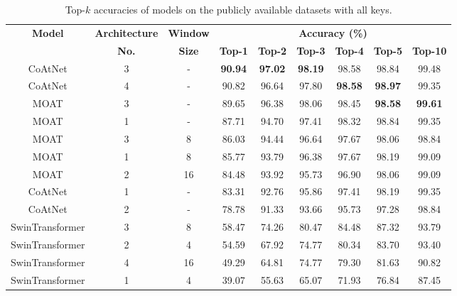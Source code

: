 \documentclass[a4paper,11pt,twoside]{report}
\theoremstyle{definition}
\begin{document}
\begin{table}[h!]
\centering
\caption{Top-$k$ accuracies of models on the publicly available datasets with all keys.}
\begin{adjustbox}{max width=\textwidth}
\begin{tabular}{c|c|c|cccccc}
\hline
\textbf{Model} & \textbf{Architecture} & \textbf{Window} & \multicolumn{6}{c}{\textbf{Accuracy (\%)}} \\
\cline{4-9}
 & \textbf{No.} & \textbf{Size} & \textbf{Top-1} & \textbf{Top-2} & \textbf{Top-3} & \textbf{Top-4} & \textbf{Top-5} & \textbf{Top-10} \\
\hline
CoAtNet & 3 & - & \textbf{90.94} & \textbf{97.02} & \textbf{98.19} & 98.58 & 98.84 & 99.48 \\
CoAtNet & 4 & - & 90.82 & 96.64 & 97.80 & \textbf{98.58} & \textbf{98.97} & 99.35 \\
MOAT & 3 & - & 89.65 & 96.38 & 98.06 & 98.45 & \textbf{98.58} & \textbf{99.61} \\
MOAT & 1 & - & 87.71 & 94.70 & 97.41 & 98.32 & 98.84 & 99.35 \\
MOAT & 3 & 8 & 86.03 & 94.44 & 96.64 & 97.67 & 98.06 & 98.84 \\
MOAT & 1 & 8 & 85.77 & 93.79 & 96.38 & 97.67 & 98.19 & 99.09 \\
MOAT & 2 & 16 & 84.48 & 93.92 & 95.73 & 96.90 & 98.06 & 99.09 \\
CoAtNet & 1 & - & 83.31 & 92.76 & 95.86 & 97.41 & 98.19 & 99.35 \\
CoAtNet & 2 & - & 78.78 & 91.33 & 93.66 & 95.73 & 97.28 & 98.84 \\
SwinTransformer & 3 & 8 & 58.47 & 74.26 & 80.47 & 84.48 & 87.32 & 93.79 \\
SwinTransformer & 2 & 4 & 54.59 & 67.92 & 74.77 & 80.34 & 83.70 & 93.40 \\
SwinTransformer & 4 & 16 & 49.29 & 64.81 & 74.77 & 79.30 & 81.63 & 90.82 \\
SwinTransformer & 1 & 4 & 39.07 & 55.63 & 65.07 & 71.93 & 76.84 & 87.45 \\
\hline
\end{tabular}
\end{adjustbox}
\end{table}
\end{document}
